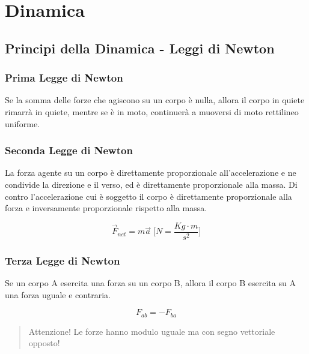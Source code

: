 \chapter{Dinamica}

    \section{Principi della Dinamica - Leggi di Newton}

        \subsection{Prima Legge di Newton} Se la somma delle forze che agiscono 
        su un corpo è nulla, allora il corpo in quiete rimarrà in quiete, 
        mentre se è in moto, continuerà a muoversi di moto rettilineo uniforme.

        \subsection{Seconda Legge di Newton} La forza agente su un corpo è 
        direttamente proporzionale all'accelerazione e ne condivide la 
        direzione e il verso, ed è direttamente proporzionale alla massa. Di 
        contro l'accelerazione cui è soggetto il corpo è direttamente 
        proporzionale alla forza e inversamente proporzionale rispetto alla 
        massa.

        \begin{equation}
            \vec{F}_{net} = m \vec{a} \; \Bigg[N = \frac{Kg \cdot m}
            {s^2} \Bigg]
        \end{equation}

        \subsection{Terza Legge di Newton} Se un corpo A esercita una forza su 
        un corpo B, allora il corpo B esercita su A una forza uguale e 
        contraria.

        \begin{equation}
            F_{ab} = - F_{ba}
        \end{equation}

        \begin{quote}
            Attenzione! Le forze hanno modulo uguale ma con segno vettoriale 
            opposto!
        \end{quote}


